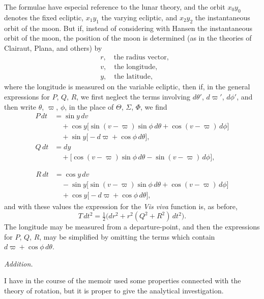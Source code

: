 \documentclass[12pt,a4paper]{article}
\theoremstyle{plain}
\begin{document}
\medskip
The formulae have especial reference to the lunar theory, and the orbit $x_{0}y_{0}$ denotes the fixed ecliptic, $x_{1}y_{1}$ the varying ecliptic, and $x_{2}y_{2}$ the instantaneous orbit of the moon. But if, instead of considering with Hansen the instantaneous orbit of the moon, the position of the moon is determined (as in the theories of Clairaut, Plana, and others) by
\begin{align*}
&r,\quad \text{the radius vector},\\
&v,\quad \text{the longitude},\\
&y,\quad \text{the latitude},
\end{align*}
where the longitude is measured on the variable ecliptic, then if, in the general expressions for $P$, $Q$, $R$, we first neglect the terms involving $d\theta'$, $d\varpi'$, $d\phi'$, and then write $\theta$, $\varpi$, $\phi$, in the place of $\Theta$, $\varSigma$, $\varPhi$, we find
\begin{align*}
P\,dt &= \sin y\,dv\\
&\quad +\cos y\bigl[\sin(v-\varpi)\sin\phi\,d\theta+\cos(v-\varpi)\,d\phi\bigr]\\
&\quad +\sin y\bigl[-d\varpi+\cos\phi\,d\theta\bigr],\\[0.3em]
Q\,dt &= dy\\
&\quad +\bigl[\cos(v-\varpi)\sin\phi\,d\theta-\sin(v-\varpi)\,d\phi\bigr],
\end{align*}

\newpage
{}
\begin{align*}
R\,dt &= \cos y\,dv\\
&\quad -\sin y\bigl[\sin(v-\varpi)\sin\phi\,d\theta+\cos(v-\varpi)\,d\phi\bigr]\\
&\quad +\cos y\bigl[-d\varpi+\cos\phi\,d\theta\bigr],
\end{align*}
and with these values the expression for the \textit{Vis viva} function is, as before,
\[
T\,dt^{2}=\tfrac{1}{2}\bigl(dr^{2}+r^{2}(Q^{2}+R^{2})\,dt^{2}\bigr).
\]
The longitude may be measured from a departure-point, and then the expressions for $P$, $Q$, $R$, may be simplified by omitting the terms which contain $d\varpi+\cos\phi\,d\theta$.

\medskip
\begin{center}
\textit{Addition.}
\end{center}

\medskip
I have in the course of the memoir used some properties connected with the theory of rotation, but it is proper to give the analytical investigation.
\end{document}

